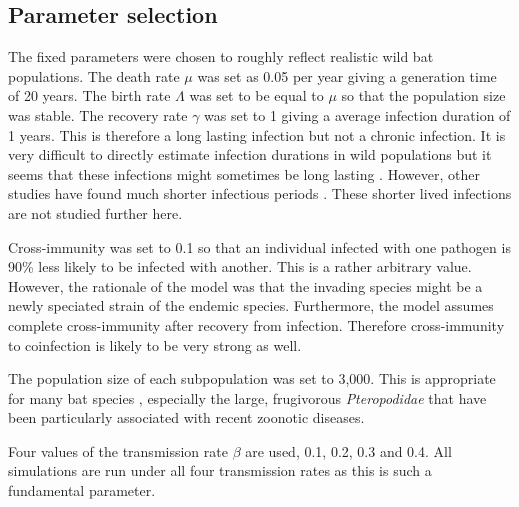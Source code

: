 \subsection{Parameter selection}


The fixed parameters were chosen to roughly reflect realistic wild bat populations. 
The death rate $\mu$ was set as 0.05 per year giving a generation time of 20 years.
The birth rate $\Lambda$ was set to be equal to $\mu$ so that the population size was stable.
The recovery rate $\gamma$ was set to 1 giving a average infection duration of 1 years. 
This is therefore a long lasting infection but not a chronic infection. 
It is very difficult to directly estimate infection durations in wild populations but it seems that these infections might sometimes be long lasting \cite{peel2012henipavirus, plowright2015ecological}.
However, other studies have found much shorter infectious periods \cite{amengual2007temporal}.
These shorter lived infections are not studied further here. %

Cross-immunity was set to 0.1 so that an individual infected with one pathogen is 90\% less likely to be infected with another.
This is a rather arbitrary value.
However, the rationale of the model was that the invading species might be a newly speciated strain of the endemic species.
Furthermore, the model assumes complete cross-immunity after recovery from infection.
Therefore cross-immunity to coinfection is likely to be very strong as well.

The population size of each subpopulation was set to 3,000. 
This is appropriate for many bat species \cite{jones2009pantheria}, especially the large, frugivorous \emph{Pteropodidae} that have been particularly associated with recent zoonotic diseases.


Four values of the transmission rate $\beta$ are used, 0.1, 0.2, 0.3 and 0.4.
All simulations are run under all four transmission rates as this is such a fundamental parameter.

